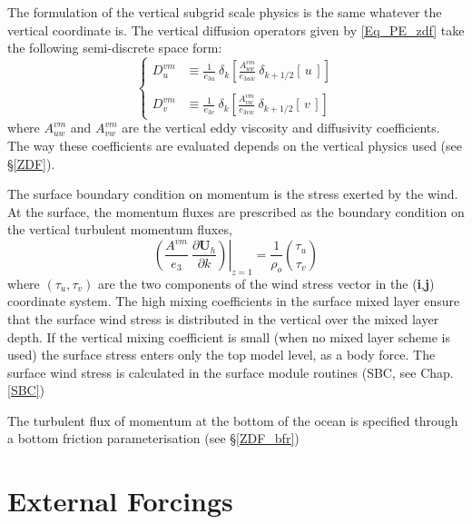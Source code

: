 The formulation of the vertical subgrid scale physics is the same whatever 
the vertical coordinate is. The vertical diffusion operators given by 
\eqref{Eq_PE_zdf} take the following semi-discrete space form:
\begin{equation} \label{Eq_dynzdf}
\left\{   \begin{aligned}
D_u^{vm} &\equiv \frac{1}{e_{3u}} \ \delta _k \left[ \frac{A_{uw}^{vm} }{e_{3uw} }
                              \ \delta _{k+1/2} [\,u\,]         \right]     \\
\\
D_v^{vm} &\equiv \frac{1}{e_{3v}} \ \delta _k \left[ \frac{A_{vw}^{vm} }{e_{3vw} }
                              \ \delta _{k+1/2} [\,v\,]         \right]
\end{aligned}   \right.
\end{equation} 
where $A_{uw}^{vm} $ and $A_{vw}^{vm} $ are the vertical eddy viscosity and 
diffusivity coefficients. The way these coefficients are evaluated 
depends on the vertical physics used (see \S\ref{ZDF}).

The surface boundary condition on momentum is the stress exerted by 
the wind. At the surface, the momentum fluxes are prescribed as the boundary 
condition on the vertical turbulent momentum fluxes,
\begin{equation} \label{Eq_dynzdf_sbc}
\left.{\left( {\frac{A^{vm} }{e_3 }\ \frac{\partial \textbf{U}_h}{\partial k}} \right)} \right|_{z=1}
	 = \frac{1}{\rho _o} \binom{\tau _u}{\tau _v }
\end{equation}
where $\left( \tau _u ,\tau _v \right)$ are the two components of the wind stress 
vector in the (\textbf{i},\textbf{j}) coordinate system. The high mixing coefficients 
in the surface mixed layer ensure that the surface wind stress is distributed in 
the vertical over the mixed layer depth. If the vertical mixing coefficient 
is small (when no mixed layer scheme is used) the surface stress enters only 
the top model level, as a body force. The surface wind stress is calculated 
in the surface module routines (SBC, see Chap.\ref{SBC})

The turbulent flux of momentum at the bottom of the ocean is specified through 
a bottom friction parameterisation (see \S\ref{ZDF_bfr})

\section{External Forcings}
\label{DYN_forcing}

